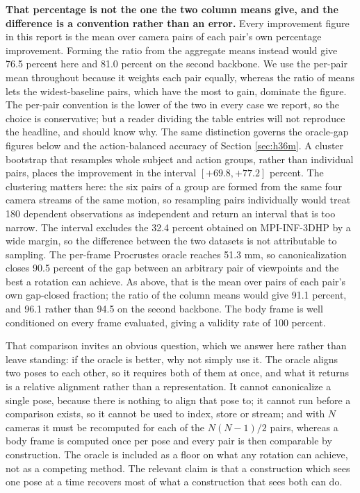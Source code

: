 \textbf{That percentage is not the one the two column means give, and the difference is a convention rather than an error.} Every improvement figure in this report is the mean over camera pairs of each pair's own percentage improvement. Forming the ratio from the aggregate means instead would give 76.5 percent here and 81.0 percent on the second backbone. We use the per-pair mean throughout because it weights each pair equally, whereas the ratio of means lets the widest-baseline pairs, which have the most to gain, dominate the figure. The per-pair convention is the lower of the two in every case we report, so the choice is conservative; but a reader dividing the table entries will not reproduce the headline, and should know why. The same distinction governs the oracle-gap figures below and the action-balanced accuracy of Section \ref{sec:h36m}. A cluster bootstrap that resamples whole subject and action groups, rather than individual pairs, places the improvement in the interval $[+69.8, +77.2]$ percent. The clustering matters here: the six pairs of a group are formed from the same four camera streams of the same motion, so resampling pairs individually would treat 180 dependent observations as independent and return an interval that is too narrow. The interval excludes the 32.4 percent obtained on MPI-INF-3DHP by a wide margin, so the difference between the two datasets is not attributable to sampling. The per-frame Procrustes oracle reaches 51.3 mm, so canonicalization closes 90.5 percent of the gap between an arbitrary pair of viewpoints and the best a rotation can achieve. As above, that is the mean over pairs of each pair's own gap-closed fraction; the ratio of the column means would give 91.1 percent, and 96.1 rather than 94.5 on the second backbone. The body frame is well conditioned on every frame evaluated, giving a validity rate of 100 percent.

That comparison invites an obvious question, which we answer here rather than leave standing: if the oracle is better, why not simply use it. The oracle aligns two poses to each other, so it requires both of them at once, and what it returns is a relative alignment rather than a representation. It cannot canonicalize a single pose, because there is nothing to align that pose to; it cannot run before a comparison exists, so it cannot be used to index, store or stream; and with $N$ cameras it must be recomputed for each of the $N(N-1)/2$ pairs, whereas a body frame is computed once per pose and every pair is then comparable by construction. The oracle is included as a floor on what any rotation can achieve, not as a competing method. The relevant claim is that a construction which sees one pose at a time recovers most of what a construction that sees both can do.

